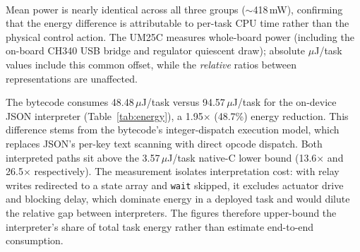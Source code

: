 \documentclass[a4paper,fleqn,longmktitle]{cas-dc}
\begin{document}
\par\vspace{0.6\baselineskip}
\begin{center}
\label{tab:energy}
\footnotesize
{}\\[2pt]
{\footnotesize Mean power is nearly identical across all three groups ($\sim$418\,mW), confirming that the energy difference is attributable to per-task CPU time rather than the physical control action. The UM25C measures whole-board power (including the on-board CH340 USB bridge and regulator quiescent draw); absolute $\mu$J/task values include this common offset, while the \emph{relative} ratios between representations are unaffected.}
\end{center}
\par\vspace{0.4\baselineskip}

The bytecode consumes 48.48\,$\mu$J/task versus 94.57\,$\mu$J/task for the on-device JSON interpreter (Table~\ref{tab:energy}), a 1.95$\times$ (48.7\%) energy reduction. This difference stems from the bytecode's integer-dispatch execution model, which replaces JSON's per-key text scanning with direct opcode dispatch. Both interpreted paths sit above the 3.57\,$\mu$J/task native-C lower bound (13.6$\times$ and 26.5$\times$ respectively). The measurement isolates interpretation cost: with relay writes redirected to a state array and \texttt{wait} skipped, it excludes actuator drive and blocking delay, which dominate energy in a deployed task and would dilute the relative gap between interpreters. The figures therefore upper-bound the interpreter's share of total task energy rather than estimate end-to-end consumption.
\end{document}

